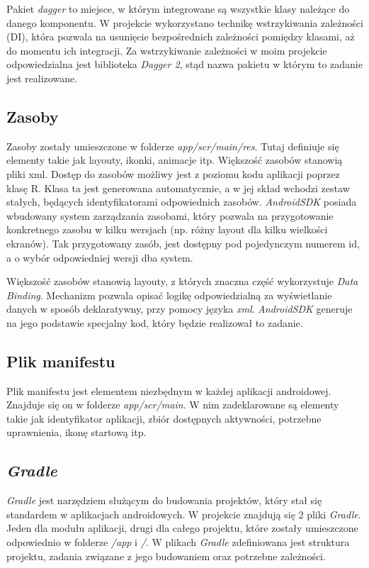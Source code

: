 \documentclass[openright]{xmgr}
\begin{document}
Pakiet \textit{dagger} to miejsce, w którym integrowane są wszystkie klasy należące do danego komponentu. W projekcie wykorzystano technikę wstrzykiwania zależności (DI), która pozwala na usunięcie bezpośrednich zależności pomiędzy klasami, aż do momentu ich integracji. Za wstrzykiwanie zależności w moim projekcie odpowiedzialna jest biblioteka \textit{Dagger 2}, stąd nazwa pakietu w którym to zadanie jest realizowane.

\subsection*{Zasoby}
Zasoby zostały umieszczone w folderze \textit{app/scr/main/res}. Tutaj definiuje się elementy takie jak layouty, ikonki, animacje itp. Większość zasobów stanowią pliki xml. Dostęp do zasobów możliwy jest z poziomu kodu aplikacji poprzez klasę R. Klasa ta jest generowana automatycznie, a w jej skład wchodzi zestaw stałych, będących identyfikatorami odpowiednich zasobów. \textit{AndroidSDK} posiada wbudowany system zarządzania zasobami, który pozwala na przygotowanie konkretnego zasobu w kilku wersjach (np. różny layout dla kilku wielkości ekranów). Tak przygotowany zasób, jest dostępny pod pojedynczym numerem id, a o wybór odpowiedniej wersji dba system.

Większość zasobów stanowią layouty, z których znaczna część wykorzystuje \textit{Data Binding}. Mechanizm pozwala opisać logikę odpowiedzialną za wyświetlanie danych w sposób deklaratywny, przy pomocy języka \textit{xml}. \textit{AndroidSDK} generuje na jego podstawie specjalny kod, który będzie realizował to zadanie. 

\subsection*{Plik manifestu}
Plik manifestu jest elementem niezbędnym w każdej aplikacji androidowej. Znajduje się on w folderze \textit{app/scr/main}. W nim zadeklarowane są elementy takie jak identyfikator aplikacji, zbiór dostępnych aktywności, potrzebne uprawnienia, ikonę startową itp.

\subsection*{\textit{Gradle}}
\textit{Gradle} jest narzędziem służącym do budowania projektów, który stał się standardem w aplikacjach androidowych. W projekcie znajdują się 2 pliki \textit{Gradle}. Jeden dla modułu aplikacji, drugi dla całego projektu, które zostały umieszczone odpowiednio w folderze \textit{/app} i \textit{/}. W plikach \textit{Gradle} zdefiniowana jest struktura projektu, zadania związane z jego budowaniem oraz potrzebne zależności.
\end{document}
